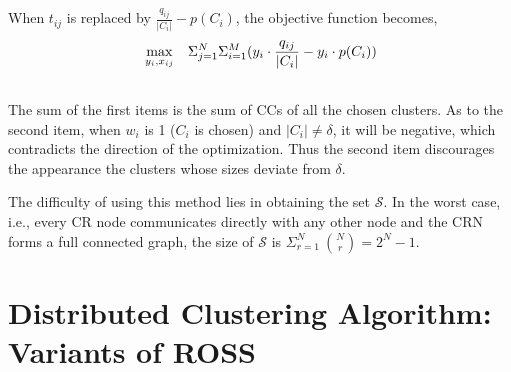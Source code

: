 \documentclass[times]{ettauth}
\newcommand{\ie}{i.e., }
\theoremstyle{mytheoremstyle}
\theoremstyle{mytheoremstyle}
\theoremstyle{mytheoremstyle}
\begin{document}

When $t_{ij}$ is replaced by $\frac{q_{ij}}{|C_i|} - p(C_i)$, the objective function becomes,
\begin{equation}
\begin{aligned}
     &\max\limits_{y_i, x_{ij}} && \Sigma_{j=1}^N\Sigma_{i=1}^M (y_i\cdot \frac{q_{ij}}{|C_i|} - y_i\cdot p(C_i)) \\
\notag
\end{aligned}
\label{centralized_opt}
\end{equation}
The sum of the first items is the sum of CCs of all the chosen clusters.
As to the second item, when $w_i$ is 1 ($C_i$ is chosen) and $|C_i|\neq\delta$, it will be negative, which contradicts the direction of the optimization.
Thus the second item discourages the appearance the clusters whose sizes deviate from $\delta$.

The difficulty of using this method lies in obtaining the set $\mathcal{S}$.
In the worst case, \ie every CR node communicates directly with any other node and the CRN forms a full connected graph, the size of $\mathcal{S}$ is $\Sigma_{r=1}^{N}\ {N \choose r} = 2^N-1$.

\section{Distributed Clustering Algorithm: Variants of ROSS}
\label{ross}
\end{document}
